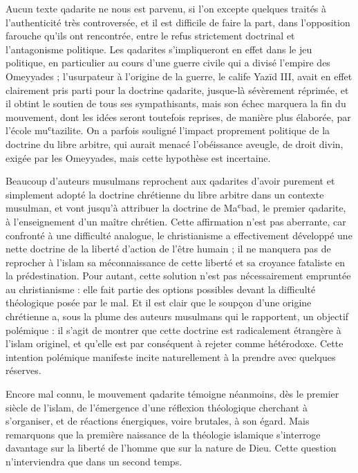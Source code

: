 Aucun texte qadarite ne nous est parvenu, si l'on excepte quelques
traités à l'authenticité très controversée, et il est difficile de
faire la part, dans l'opposition farouche qu'ils ont rencontrée, entre
le refus strictement doctrinal et l'antagonisme politique. Les qadarites
s'impliqueront en effet dans le jeu politique, en particulier au cours
d'une guerre civile qui a divisé l'empire des Omeyyades  ; l'usurpateur à l'origine de la guerre, le calife Yazīd III, avait
en effet clairement pris parti pour la doctrine qadarite, jusque-là
sévèrement réprimée, et il obtint le soutien de tous ses sympathisants,
mais son échec marquera la fin du mouvement, dont les idées seront
toutefois reprises, de manière plus élaborée, par l'école muʿtazilite.
On a parfois souligné l'impact proprement politique de la doctrine du
libre arbitre, qui aurait menacé l'obéissance aveugle, de droit divin,
exigée par les Omeyyades, mais cette hypothèse est incertaine.

Beaucoup d'auteurs musulmans reprochent aux qadarites d'avoir purement
et simplement adopté la doctrine chrétienne du libre arbitre dans un
contexte musulman, et vont jusqu'à attribuer la doctrine de Maʿbad, le
premier qadarite, à l'enseignement d'un maître chrétien. Cette
affirmation n'est pas aberrante, car confronté à une difficulté
analogue, le christianisme a effectivement développé une nette doctrine
de la liberté d'action de l'être humain ; il ne manquera pas de
reprocher à l'islam sa méconnaissance de cette liberté et sa croyance
fataliste en la prédestination. Pour autant, cette solution n'est pas
nécessairement empruntée au christianisme : elle fait partie des options
possibles devant la difficulté théologique posée par le mal. Et il est
clair que le soupçon d'une origine chrétienne a, sous la plume des
auteurs musulmans qui le rapportent, un objectif polémique : il s'agit
de
montrer que cette doctrine est radicalement étrangère à l'islam
originel, et qu'elle est par conséquent à rejeter comme hétérodoxe.
Cette intention polémique manifeste incite naturellement à la prendre
avec quelques réserves.

Encore mal connu, le mouvement qadarite témoigne néanmoins, dès le
premier siècle de l'islam, de l'émergence d'une réflexion théologique
cherchant à s'organiser, et de réactions énergiques, voire brutales, à
son égard. Mais remarquons que la première naissance de la théologie
islamique s'interroge davantage sur la liberté de l'homme que sur la
nature de Dieu. Cette question n'interviendra que dans un second temps.

